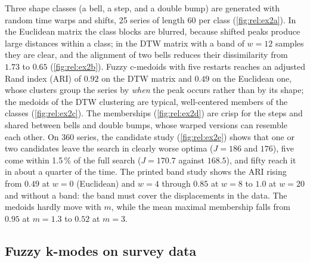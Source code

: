 Three shape classes (a bell, a step, and a double bump) are generated with random time warps and shifts, 25 series of length 60 per class (\cref{fig:rel:ex2a}). In the Euclidean matrix the class blocks are blurred, because shifted peaks produce large distances within a class; in the DTW matrix with a band of $w=12$ samples they are clear, and the alignment of two bells reduces their dissimilarity from $1.73$ to $0.65$ (\cref{fig:rel:ex2b}). Fuzzy c-medoids with five restarts reaches an adjusted Rand index (ARI) of $0.92$ on the DTW matrix and $0.49$ on the Euclidean one, whose clusters group the series by \emph{when} the peak occurs rather than by its shape; the medoids of the DTW clustering are typical, well-centered members of the classes (\cref{fig:rel:ex2c}). The memberships (\cref{fig:rel:ex2d}) are crisp for the steps and shared between bells and double bumps, whose warped versions can resemble each other. On 360 series, the candidate study (\cref{fig:rel:ex2e}) shows that one or two candidates leave the search in clearly worse optima ($J=186$ and $176$), five come within 1.5\,\% of the full search ($J=170.7$ against $168.5$), and fifty reach it in about a quarter of the time. The printed band study shows the ARI rising from $0.49$ at $w=0$ (Euclidean) and $w=4$ through $0.85$ at $w=8$ to $1.0$ at $w=20$ and without a band: the band must cover the displacements in the data. The medoids hardly move with $m$, while the mean maximal membership falls from $0.95$ at $m=1.3$ to $0.52$ at $m=3$.


\subsection{Fuzzy k-modes on survey data}

